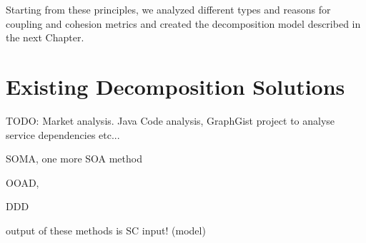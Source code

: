 Starting from these principles, we analyzed different types and reasons for coupling and cohesion metrics and created the decomposition model described in the next Chapter.



\section{Existing Decomposition Solutions}

TODO: Market analysis. Java Code analysis, GraphGist project to analyse service dependencies etc... %

SOMA, one more SOA method

OOAD, 

DDD

output of these methods is SC input! (model)


